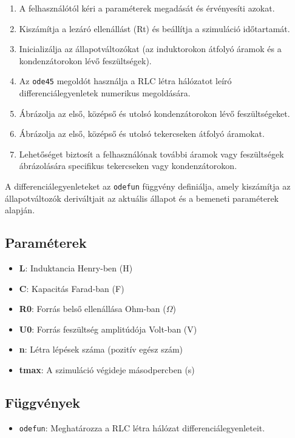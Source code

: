 \documentclass[12pt,a4paper]{article}
\begin{document}
\begin{enumerate}
    \item A felhasználótól kéri a paraméterek megadását és érvényesíti azokat.
    \item Kiszámítja a lezáró ellenállást (Rt) és beállítja a szimuláció időtartamát.
    \item Inicializálja az állapotváltozókat (az induktorokon átfolyó áramok és a kondenzátorokon lévő feszültségek).
    \item Az \texttt{ode45} megoldót használja a RLC létra hálózatot leíró differenciálegyenletek numerikus megoldására.
    \item Ábrázolja az első, középső és utolsó kondenzátorokon lévő feszültségeket.
    \item Ábrázolja az első, középső és utolsó tekercseken átfolyó áramokat.
    \item Lehetőséget biztosít a felhasználónak további áramok vagy feszültségek ábrázolására specifikus tekercseken vagy kondenzátorokon.
\end{enumerate}

A differenciálegyenleteket az \texttt{odefun} függvény definiálja, amely kiszámítja az állapotváltozók deriváltjait az aktuális állapot és a bemeneti paraméterek alapján.

\subsection*{Paraméterek}

\begin{itemize}
    \item \textbf{L}: Induktancia Henry-ben (H)
    \item \textbf{C}: Kapacitás Farad-ban (F)
    \item \textbf{R0}: Forrás belső ellenállása Ohm-ban (\(\Omega\))
    \item \textbf{U0}: Forrás feszültség amplitúdója Volt-ban (V)
    \item \textbf{n}: Létra lépések száma (pozitív egész szám)
    \item \textbf{tmax}: A szimuláció végideje másodpercben (s)
\end{itemize}

\subsection*{Függvények}

\begin{itemize}
    \item \texttt{odefun}: Meghatározza a RLC létra hálózat differenciálegyenleteit.
\end{itemize}
\end{document}

